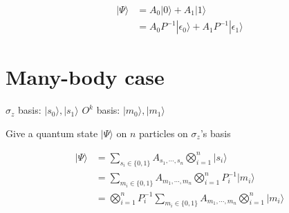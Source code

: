 \documentclass{article}
\newcommand{\rket}[1]{|#1\rangle}
\begin{document}
\begin{equation}
\begin{aligned}
\rket{\Psi} &= A_0\rket{0} + A_1\rket{1}\\
            &= A_0 P^{-1}\rket{\epsilon_0} + A_1 P^{-1} \rket{\epsilon_1}
\end{aligned}
\end{equation}

\section{Many-body case}

$\sigma_z$ basis: $\rket{s_0}, \rket{s_1}$
$O^k$ basis: $\rket{m_0}, \rket{m_1}$

Give a quantum state $\rket{\Psi}$ on $n$ particles on $\sigma_z$'s basis

\begin{equation}
\begin{aligned}
\rket{\Psi} &= \sum_{s_i\in\{0, 1\}} A_{s_1,\cdots, s_n}\bigotimes_{i=1}^{n}\rket{s_i}\\
            &= \sum_{m_i\in\{0, 1\}} A_{m_1, \cdots, m_n}\bigotimes_{i=1}^{n} P_i^{-1}\rket{m_i}\\
            &= \bigotimes_{i=1}^{n} P_i^{-1} \sum_{m_i\in\{0, 1\}}A_{m_1, \cdots, m_n} \bigotimes_{i=1}^{n} \rket{m_i}
\end{aligned}
\end{equation}
\end{document}
